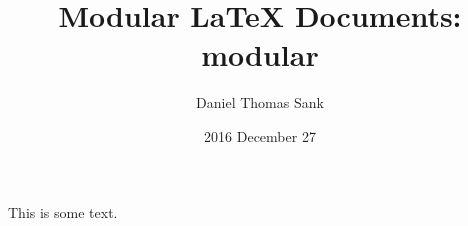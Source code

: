 \documentclass{article}
\title{Modular LaTeX Documents: \textbf{modular}}
\author{Daniel Thomas Sank}
\date{2016 December 27}
\begin{document}
\maketitle
\tableofcontents

This is some text.
\end{document}

